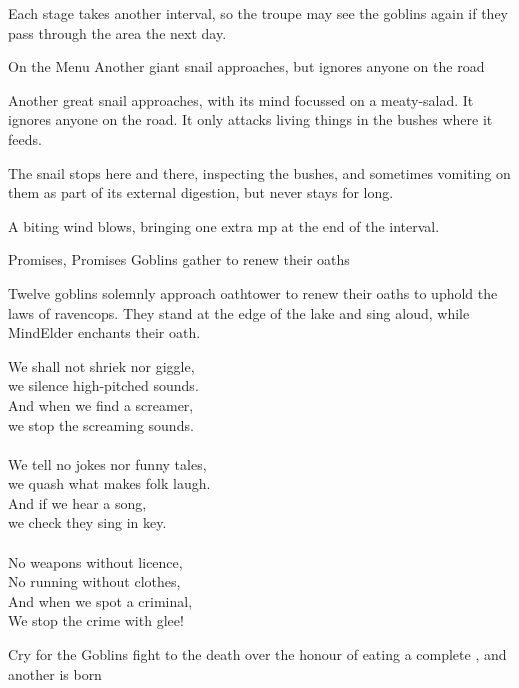 Each stage takes another \gls{interval}, so the troupe may see the goblins again if they pass through the area the next day.

{On the Menu}%
{Another giant snail approaches, but ignores anyone on the road}%

Another great snail approaches, with its mind focussed on a meaty-salad.
It ignores anyone on the road.
It only attacks living things in the bushes where it feeds.

The snail stops here and there, inspecting the bushes, and sometimes vomiting on them as part of its external digestion, but never stays for long.

A biting wind blows, bringing one extra \gls{mp} at the end of the \gls{interval}.

{Promises, Promises}%
{Goblins gather to renew their oaths}%

Twelve goblins solemnly approach \gls{oathtower} to renew their oaths to uphold the laws of \gls{ravencops}.
They stand at the edge of the lake and sing aloud, while \gls{MindElder} enchants their oath.

\label{ravencopsLaws}
\begin{speechtext}
  We shall not shriek nor giggle, \\
  we silence high-pitched sounds. \\
  And when we find a screamer, \\
  we stop the screaming sounds. \\
  \\
  We tell no jokes nor funny tales, \\
  we quash what makes folk laugh. \\
  And if we hear a song, \\
  we check they sing in key. \\
  \\
  No weapons without licence, \\
  No running without clothes, \\
  And when we spot a criminal, \\
  We stop the crime with glee!
\end{speechtext}

{Cry for the }%
{Goblins fight to the death over the honour of eating a complete , and another  is born}%

